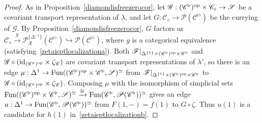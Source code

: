 \documentclass{tac}
\newcommand{\s}[1]{\mathscr{#1}}
\newcommand{\tx}[1]{\textnormal{#1}}
\newcommand{\ul}[1]{\underline{#1}}
\begin{document}
\begin{proof}
As in Proposition~\ref{diamondisfreezerocor}, let $\s{G} : (\s{C}^\triangleright )^\tx{op} \times \s{C}_\diamond \to \s{S}$ be a covariant transport representation of $\ul{\lambda}$, and let $G : \s{C}_\diamond \to \s{P}(\s{C}^\triangleright )$ be the currying of $\s{G}$.  By Proposition~\ref{diamondisfreezerocor}, $G$ factors as $\s{C}_\diamond \xrightarrow{g} \s{P}^{\{\Delta^{-1} \}}_\s{R} (\s{C}^\triangleright ) \hookrightarrow \s{P}(\s{C}^\triangleright)$, where $g$ is a categorical equivalence (satisfying~\ref{zetaisptlocalizationa}).  Both $\s{F}|_{\Delta^{\{1\}} \times (\s{C}^\triangleright )^\tx{op} \times \s{C}^\triangleright}$ and $\s{G} \circ (\tx{id}_{(\s{C}^\triangleright )^\tx{op} } \times \zeta_{\s{C}})$ are covariant transport representations of $\lambda'$, so there is an edge $\mu : \Delta^1 \to \tx{Fun}( (\s{C}^\triangleright )^\tx{op} \times \s{C}^\triangleright , \s{S}  )^\simeq$ from $\s{F}|_{\Delta^{\{1\}} \times (\s{C}^\triangleright )^\tx{op} \times \s{C}^\triangleright}$ to $\s{G} \circ (\tx{id}_{(\s{C}^\triangleright )^\tx{op} } \times \zeta_{\s{C}})$.  Composing $\mu$ with the isomorphism of simplicial sets $\tx{Fun}( (\s{C}^\triangleright )^\tx{op} \times \s{C}^\triangleright , \s{S}  )^\simeq \xrightarrow{\cong} \tx{Fun}(  \s{C}^\triangleright , \s{P}(\s{C}^\triangleright )  )^\simeq$ gives an edge $u : \Delta^1 \to \tx{Fun}(  \s{C}^\triangleright , \s{P}(\s{C}^\triangleright )  )^\simeq$ from $F(1,-) = f(1)$ to $G \circ \zeta$.  Thus $u(1)$ is a candidate for $h(1)$ in~\ref{zetaisptlocalizationb}.

\hfill


\end{proof}
\end{document}
